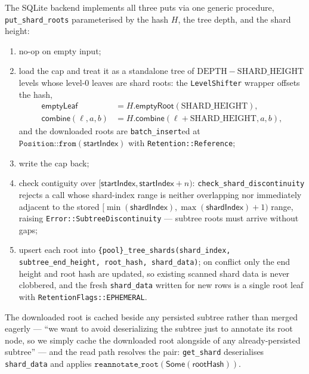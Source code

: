 \documentclass[11pt,a4paper]{article}
\theoremstyle{definition}
\begin{document}
The SQLite backend implements all three puts via one generic procedure,
\texttt{put\_shard\_roots} parameterised by the hash $H$, the tree
depth, and the shard height:
\begin{enumerate}[label=(\arabic*)]
\item no-op on empty input;
\item load the cap and treat it as a standalone tree of
  $\mathrm{DEPTH} - \mathrm{SHARD\_HEIGHT}$ levels whose level-$0$ leaves
  are shard roots: the \texttt{LevelShifter} wrapper offsets the hash,
  \[
  \begin{aligned}
  \mathsf{emptyLeaf} &= H.\mathsf{emptyRoot}(\mathrm{SHARD\_HEIGHT}), \\
  \mathsf{combine}(\ell, a, b) &=
    H.\mathsf{combine}(\ell + \mathrm{SHARD\_HEIGHT}, a, b),
  \end{aligned}
  \]
  and the downloaded roots are \texttt{batch\_insert}ed at
  $\texttt{Position::from}(\mathsf{startIndex})$ with
  \texttt{Retention::Reference};
\item write the cap back;
\item check contiguity over
  $[\mathsf{startIndex}, \mathsf{startIndex} + n)$:
  \texttt{check\_shard\_discontinuity} rejects a call whose shard-index
  range is neither overlapping nor immediately adjacent to the stored
  $[\min(\mathsf{shardIndex}), \max(\mathsf{shardIndex}) + 1)$ range,
  raising \texttt{Error::SubtreeDiscontinuity} --- subtree roots must
  arrive without gaps;
\item upsert each root into
  \texttt{\{pool\}\_tree\_shards(shard\_index, subtree\_end\_height,
  root\_hash, shard\_data)}; on conflict only the end height and root
  hash are updated, so existing scanned shard data is never clobbered,
  and the fresh \texttt{shard\_data} written for new rows is a single
  root leaf with \texttt{RetentionFlags::EPHEMERAL}.
\end{enumerate}
The downloaded root is cached beside any persisted subtree rather than
merged eagerly --- ``we want to avoid deserializing the subtree just to
annotate its root node, so we simply cache the downloaded root alongside
of any already-persisted subtree'' --- and the read path resolves the
pair: \texttt{get\_shard} deserialises \texttt{shard\_data} and applies
$\texttt{reannotate\_root}(\mathsf{Some}(\mathsf{rootHash}))$.
\end{document}
